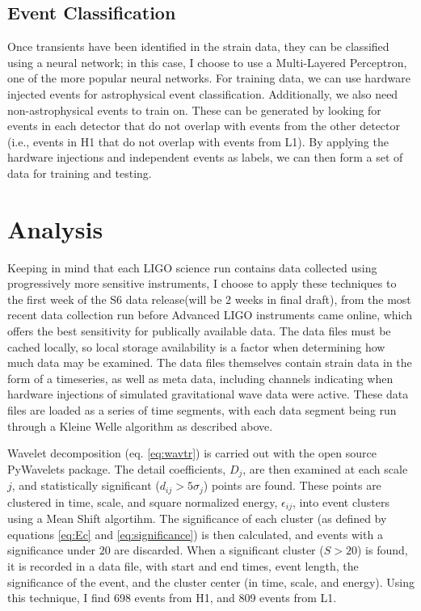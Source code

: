 \documentclass{article}
\begin{document}
\subsection{Event Classification}
Once transients have been identified in the strain data, they can be classified using a neural network; in this case, I choose to use a Multi-Layered Perceptron, one of the more popular neural networks. For training data, we can use hardware injected events for astrophysical event classification. Additionally, we also need non-astrophysical events to train on. These can be generated by looking for events in each detector that do not overlap with events from the other detector (i.e., events in H1 that do not overlap with events from L1). By applying the hardware injections and independent events as labels, we can then form a set of data for training and testing.

\section{Analysis}
Keeping in mind that each LIGO science run contains data collected using progressively more sensitive instruments, I choose to apply these techniques to the first week of the S6 data release\citep{LIGOScientificCollaboration2015}(will be 2 weeks in final draft), from the most recent data collection run before Advanced LIGO instruments came online, which offers the best sensitivity for publically available data. The data files must be cached locally, so local storage availability is a factor when determining how much data may be examined. The data files themselves contain strain data in the form of a timeseries, as well as meta data, including channels indicating when hardware injections of simulated gravitational wave data were active. These data files are loaded as a series of time segments, with each data segment being run through a Kleine Welle algorithm as described above.

Wavelet decomposition (eq. \ref{eq:wavtr}) is carried out with the open source PyWavelets package\citep{Wasilewski}. The detail coefficients, $D_{j}$, are then examined at each scale $j$, and statistically significant ($d_{ij} > 5\sigma_{j}$) points are found. These points are clustered in time, scale, and square normalized energy, $\epsilon_{ij}$, into event clusters using a Mean Shift algortihm. The significance of each cluster (as defined by equations \ref{eq:Ec} and \ref{eq:significance}) is then calculated, and events with a significance under $20$ are discarded. When a significant cluster ($S > 20$) is found, it is recorded in a data file, with start and end times, event length, the significance of the event, and the cluster center (in time, scale, and energy). Using this technique, I find 698 events from H1, and 809 events from L1.
\end{document}
